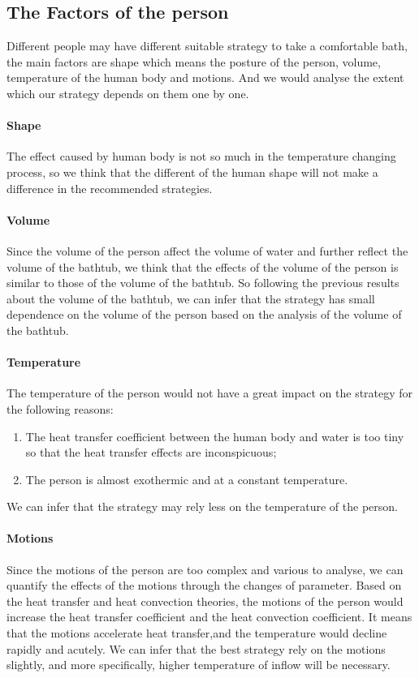 \documentclass[12pt]{article}
\begin{document}
\subsection{The Factors of the person}
Different people may have different suitable strategy to take a comfortable bath, the main factors
are shape which means the posture of the person, volume, temperature of the human body and motions.
And we would analyse the extent which our strategy depends on them one by one.

\paragraph{Shape}The effect caused by human body is not so much in the temperature changing process,
so we think that the different of the human shape will not make a difference in the recommended
strategies.

\paragraph{Volume}Since the volume of the person affect the volume of water and further reflect the
volume of the bathtub, we think that the effects of the volume of the person is similar to those of
the volume of the bathtub. So following the previous results about the volume of the bathtub, we can
infer that the strategy has small dependence on the volume of the person based on the analysis of
the volume of the bathtub.

\paragraph{Temperature}The temperature of the person would not have a great impact on the strategy
for the following reasons:
\begin{enumerate}[\bf 1.]
    \item The heat transfer coefficient between the human body and water is too tiny so that the
    heat transfer effects are inconspicuous;
    \item The person is almost exothermic and at a constant temperature.
\end{enumerate}
We can infer that the strategy may rely less on the temperature of the person.

\paragraph{Motions}Since the motions of the person are too complex and various to analyse, we can
quantify the effects of the motions through the changes of parameter. Based on the heat transfer and
heat convection theories, the motions of the person would increase the heat transfer coefficient and
the heat convection coefficient. It means that the motions accelerate heat transfer,and the
temperature would decline rapidly and acutely. We can infer that the best strategy rely on the
motions slightly, and more specifically, higher temperature of inflow will be necessary.
\end{document}
